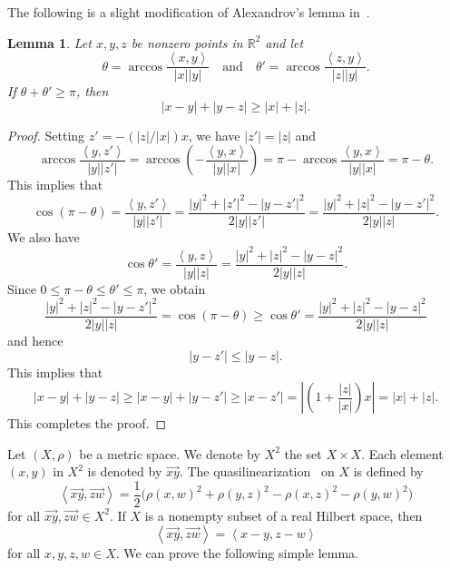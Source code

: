 \documentclass[draft]{amsart}
\numberwithin{equation}{section}
\def\R{\mathbb R}
\newcommand{\ip}[2]{\left\langle #1, #2 \right\rangle}
\providecommand{\abs}[1]{\left\lvert#1\right\rvert}
\theoremstyle{plain}
\newtheorem{lemma}[theorem]{Lemma}
\theoremstyle{definition}
\theoremstyle{remark}
\begin{document}
The following is a slight modification of 
Alexandrov's lemma in~\cite{MR1744486}. 

\begin{lemma}\label{lem:Alex}
 Let $x,y,z$ be nonzero points in $\R^2$ 
 and let 
 \[
  \theta = \arccos \frac{\ip{x}{y}}{\abs{x}\abs{y}} 
 \quad \textrm{and} \quad 
  \theta' = \arccos \frac{\ip{z}{y}}{\abs{z}\abs{y}}. 
 \]
 If $\theta+\theta' \geq \pi$, 
 then 
 \[
  \abs{x-y} + \abs{y-z} \geq \abs{x} + \abs{z}. 
 \]
\end{lemma}

\begin{proof}
 Setting $z'=-(\abs{z}/\abs{x})x$, we have 
 $\abs{z'}=\abs{z}$ and 
 \[
  \arccos \frac{\ip{y}{z'}}{\abs{y}\abs{z'}}
  = \arccos \left(- \frac{\ip{y}{x}}{\abs{y}\abs{x}}\right)
  = \pi - \arccos \frac{\ip{y}{x}}{\abs{y}\abs{x}}
  = \pi - \theta. 
 \]
 This implies that 
 \[
  \cos (\pi-\theta) 
  = \frac{\ip{y}{z'}}{\abs{y}\abs{z'}}
  = \frac{\abs{y}^2 + \abs{z'}^2 - \abs{y-z'}^2}
    {2\abs{y}\abs{z'}}
  = \frac{\abs{y}^2 + \abs{z}^2 - \abs{y-z'}^2}
    {2\abs{y}\abs{z}}. 
 \]
 We also have 
 \[
  \cos \theta ' 
  = \frac{\ip{y}{z}}{\abs{y}\abs{z}}
  = \frac{\abs{y}^2 + \abs{z}^2 - \abs{y-z}^2}
    {2\abs{y}\abs{z}}. 
 \]
 Since $0\leq \pi -\theta \leq \theta ' \leq \pi$, we obtain 
 \[
 \frac{\abs{y}^2 + \abs{z}^2 - \abs{y-z'}^2}
    {2\abs{y}\abs{z}}
 = \cos (\pi-\theta)
 \geq 
 \cos \theta ' 
 = \frac{\abs{y}^2 + \abs{z}^2 - \abs{y-z}^2}
    {2\abs{y}\abs{z}}
 \]
 and hence 
 \[
  \abs{y-z'} \leq \abs{y-z}. 
 \]
 This implies that 
 \[
  \abs{x-y}+\abs{y-z}
  \geq \abs{x-y}+\abs{y-z'}
  \geq \abs{x-z'} 
= \abs{
  \left(1+\frac{\abs{z}}{\abs{x}}\right)x}
  =\abs{x}+\abs{z}. 
 \]
 This completes the proof. 
\end{proof}

Let $(X, \rho)$ be a metric space. 
We denote by $X^2$ the set $X\times X$. 
Each element $(x,y)$ in $X^2$ is denoted by $\overrightarrow{xy}$. 
The quasilinearization~\cite{MR2390077} on $X$ 
is defined by 
\[
 \ip{\overrightarrow{xy}}{\overrightarrow{zw}} 
 = \frac{1}{2} \bigl(\rho(x,w)^2 + \rho(y,z)^2 
 - \rho(x,z)^2 - \rho(y,w)^2 \bigr)
\]
for all $\overrightarrow{xy}, \overrightarrow{zw}\in X^2$. 
If $X$ is a nonempty subset of a real Hilbert space, 
then 
\[
  \ip{\overrightarrow{xy}}{\overrightarrow{zw}} 
  = \ip{x-y}{z-w}
\]
for all $x,y,z,w\in X$. We can prove the following simple lemma. 
\end{document}
